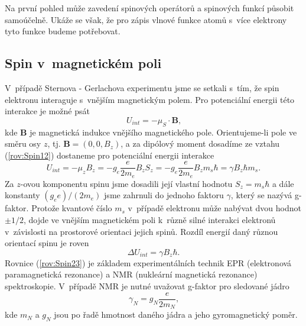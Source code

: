 Na první pohled může zavedení spinových operátorů a spinových funkcí působit samoúčelně. Ukáže se však, že pro zápis vlnové funkce atomů s~více elektrony tyto funkce budeme potřebovat.



\subsection{Spin v~magnetickém poli}
\label{kap:SpinMagPole}

V~případě Sternova - Gerlachova experimentu jsme se setkali s~tím, že spin elektronu interaguje s~vnějším magnetickým polem. Pro potenciální energii této interakce je možné psát
\begin{equation}
U_{int} = - \mu_S \cdot \mathbf{B} \mbox{,}
\label{rov:Spin21}
\end{equation}
kde $\mathbf{B}$ je magnetická indukce vnějšího magnetického pole. Orientujeme-li pole ve směru osy $z$, tj. $\mathbf{B}=(0, 0, B_z)$, a za dipólový moment dosadíme ze vztahu (\ref{rov:Spin12}) dostaneme pro potenciální energii interakce
\begin{equation}
U_{int} = -\mu_z B_z = -g_e \frac{e}{2m_e} B_z S_z = -g_e \frac{e}{2m_e} B_z  m_s \hbar  = \gamma B_z \hbar m_s \mbox{.}
\label{rov:Spin22}
\end{equation}
Za $z$-ovou komponentu spinu jsme dosadili její vlastní hodnotu $S_z = m_s \hbar$ a dále konstanty $(g_e e)/(2m_e)$ jsme zahrnuli do jednoho faktoru $\gamma$, který se nazývá g-faktor. Protože kvantové číslo $m_s$ v~případě elektronu může nabývat dvou hodnot $\pm 1/2$, dojde ve vnějším magnetickém poli k~různě silné interakci elektronů v~závislosti na prostorové orientaci jejich spinů. Rozdíl energií daný různou orientací spinu je roven
\begin{equation}
\Delta U_{int} = \gamma B_z \hbar \mbox{.}
\label{rov:Spin23}
\end{equation}
Rovnice (\ref{rov:Spin23}) je základem experimentálních technik EPR (elektronová paramagnetická rezonance) a NMR (nukleární magnetická rezonance) spektroskopie. V~případě NMR je nutné uvažovat g-faktor pro sledované jádro
\begin{equation}
\gamma_N = g_N \frac{e}{2m_N} \mbox{,}
\label{rov:Spin24}
\end{equation}
kde $m_N$ a $g_N$ jsou po řadě hmotnost daného jádra a jeho gyromagnetický poměr.

